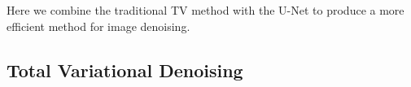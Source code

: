 \documentclass[12pt]{article}
\begin{document}








Here we combine the traditional TV method with the U-Net to produce a more efficient method for image denoising.





\subsection{Total Variational Denoising}
\end{document}
